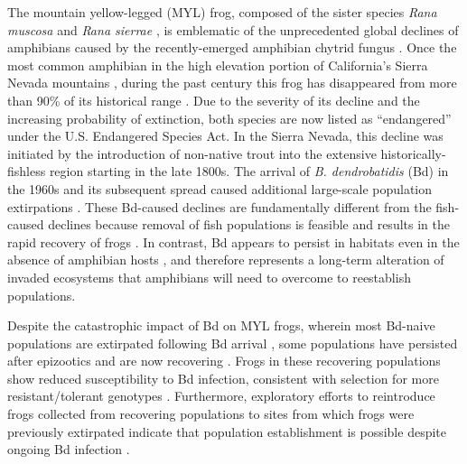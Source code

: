 \documentclass[9pt,twocolumn,twoside,lineno]{pnas-new}
\begin{document}
The mountain yellow-legged (MYL) frog, composed of the sister species
\emph{Rana muscosa} and \emph{Rana sierrae} \citep{vredenburg2007}, is
emblematic of the unprecedented global declines of amphibians caused by
the recently-emerged amphibian chytrid fungus
\citep[\emph{Batrachochytrium dendrobatidis,}][]{scheele2019}. Once the
most common amphibian in the high elevation portion of California's
Sierra Nevada mountains \citep[USA,][]{grinnell1924}, during the past
century this frog has disappeared from more than 90\% of its historical
range \citep{vredenburg2007}. Due to the severity of its decline and the
increasing probability of extinction, both species are now listed as
``endangered'' under the U.S. Endangered Species Act. In the Sierra
Nevada, this decline was initiated by the introduction of non-native
trout into the extensive historically-fishless region
\citep{bradford1989, knapp2000} starting in the late 1800s. The arrival
of \emph{B. dendrobatidis} (Bd) in the 1960s and its subsequent spread
\citep{vredenburg2019} caused additional large-scale population
extirpations \citep{vredenburg2010, rachowicz2006}. These Bd-caused
declines are fundamentally different from the fish-caused declines
because removal of fish populations is feasible and results in the rapid
recovery of frogs \citep{knapp2007, vredenburg2004}. In contrast, Bd
appears to persist in habitats even in the absence of amphibian hosts
\citep{walker2007}, and therefore represents a long-term alteration of
invaded ecosystems that amphibians will need to overcome to reestablish
populations.

Despite the catastrophic impact of Bd on MYL frogs, wherein most
Bd-naive populations are extirpated following Bd arrival
\citep{vredenburg2010}, some populations have persisted after epizootics
\citep{briggs2010} and are now recovering \citep{knapp2016}. Frogs in
these recovering populations show reduced susceptibility to Bd
infection, consistent with selection for more resistant/tolerant
genotypes \citep{knapp2016}. Furthermore, exploratory efforts to
reintroduce frogs collected from recovering populations to sites from
which frogs were previously extirpated indicate that population
establishment is possible despite ongoing Bd infection
\citep{joseph2018}.
\end{document}
